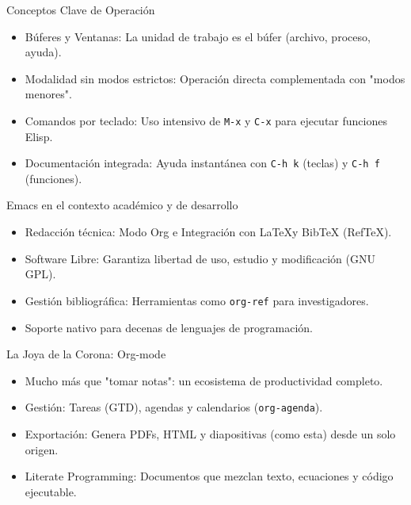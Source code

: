 \documentclass[presentation]{beamer}
\begin{document}
\begin{frame}{Conceptos Clave de Operación}
 \begin{itemize}
\item \alert{\alert{Búferes y Ventanas:}} La unidad de trabajo es el búfer (archivo, proceso, ayuda).
\item \alert{\alert{Modalidad sin modos estrictos:}} Operación directa complementada con "modos menores".
\item \alert{\alert{Comandos por teclado:}} Uso intensivo de \texttt{M-x} y \texttt{C-x} para ejecutar funciones Elisp.
\item \alert{\alert{Documentación integrada:}} Ayuda instantánea con \texttt{C-h k} (teclas) y \texttt{C-h f} (funciones).
\end{itemize}
\end{frame}

\begin{frame}{Emacs en el contexto académico y de desarrollo}
 \begin{itemize}
\item \alert{\alert{Redacción técnica:}} Modo \alert{Org} e Integración con \LaTeX y BibTeX (RefTeX).
\item \alert{\alert{Software Libre:}} Garantiza libertad de uso, estudio y
modificación (GNU GPL).
\item \alert{\alert{Gestión bibliográfica:}} Herramientas como \texttt{org-ref} para investigadores.
\item Soporte nativo para decenas de lenguajes de programación.
\end{itemize}
\end{frame}

\begin{frame}{La Joya de la Corona: Org-mode}
 \begin{itemize}
\item Mucho más que "tomar notas": un ecosistema de productividad completo.
\item \alert{\alert{Gestión:}} Tareas (GTD), agendas y calendarios (\texttt{org-agenda}).
\item \alert{\alert{Exportación:}} Genera PDFs, HTML y diapositivas (como esta) desde un solo origen.
\item \alert{\alert{Literate Programming:}} Documentos que mezclan texto, ecuaciones y código ejecutable.
\end{itemize}
\end{frame}
\end{document}
